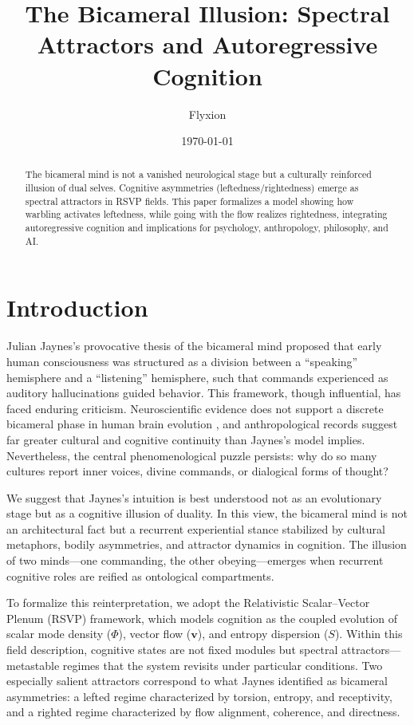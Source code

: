 \documentclass[a4paper,11pt]{article}
\title{The Bicameral Illusion: Spectral Attractors and Autoregressive Cognition}
\author{Flyxion}
\date{\today}
\begin{document}
\maketitle

\begin{abstract}
The bicameral mind is not a vanished neurological stage but a culturally reinforced illusion of dual selves. Cognitive asymmetries (leftedness/rightedness) emerge as spectral attractors in RSVP fields. This paper formalizes a model showing how warbling activates leftedness, while going with the flow realizes rightedness, integrating autoregressive cognition and implications for psychology, anthropology, philosophy, and AI.
\end{abstract}

\section{Introduction}

Julian Jaynes’s provocative thesis of the bicameral mind \citep{jaynes1976origin} proposed that early human consciousness was structured as a division between a ``speaking'' hemisphere and a ``listening'' hemisphere, such that commands experienced as auditory hallucinations guided behavior. This framework, though influential, has faced enduring criticism. Neuroscientific evidence does not support a discrete bicameral phase in human brain evolution \citep{McVeigh2018}, and anthropological records suggest far greater cultural and cognitive continuity than Jaynes’s model implies. Nevertheless, the central phenomenological puzzle persists: why do so many cultures report inner voices, divine commands, or dialogical forms of thought?

We suggest that Jaynes’s intuition is best understood not as an evolutionary stage but as a cognitive illusion of duality. In this view, the bicameral mind is not an architectural fact but a recurrent experiential stance stabilized by cultural metaphors, bodily asymmetries, and attractor dynamics in cognition. The illusion of two minds—one commanding, the other obeying—emerges when recurrent cognitive roles are reified as ontological compartments.

To formalize this reinterpretation, we adopt the Relativistic Scalar--Vector Plenum (RSVP) framework, which models cognition as the coupled evolution of scalar mode density ($\Phi$), vector flow ($\mathbf{v}$), and entropy dispersion ($S$). Within this field description, cognitive states are not fixed modules but spectral attractors—metastable regimes that the system revisits under particular conditions. Two especially salient attractors correspond to what Jaynes identified as bicameral asymmetries: a lefted regime characterized by torsion, entropy, and receptivity, and a righted regime characterized by flow alignment, coherence, and directness.
\end{document}
